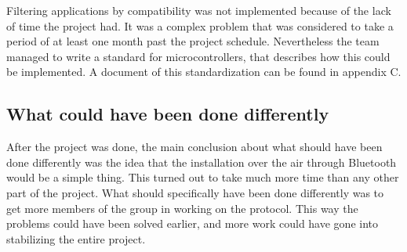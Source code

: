 			Filtering applications by compatibility was not implemented because of the lack of time the project had. It was a complex problem that was considered to take a period of at least one month past the project schedule. Nevertheless the team managed to write a standard for microcontrollers, that describes how this could be implemented. A document of this standardization can be found in appendix C. \\

		\subsection{What could have been done differently}
		After the project was done, the main conclusion about what should have been done differently was the idea that the installation over the air through Bluetooth would be a simple thing. This turned out to take much more time than any other part of the project. What should specifically have been done differently was to get more members of the group in working on the protocol. This way the problems could have been solved earlier, and more work could have gone into stabilizing the entire project.
